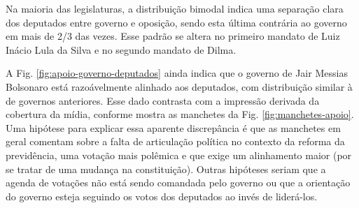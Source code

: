 \documentclass[12pt,a4paper]{article}
\begin{document}
Na maioria das legislaturas, a distribuição bimodal indica uma separação clara dos deputados
entre governo e oposição, sendo esta última contrária ao governo em mais de 2/3 das vezes.
Esse padrão se altera no primeiro mandato de Luiz Inácio Lula da Silva e no segundo mandato de Dilma.

A Fig. \ref{fig:apoio-governo-deputados} ainda indica que o governo de Jair Messias Bolsonaro está 
razoávelmente alinhado aos deputados, com distribuição similar à de governos anteriores. Esse dado contrasta
com a impressão derivada da cobertura da mídia, conforme mostra as manchetes da Fig. \ref{fig:manchetes-apoio}.
Uma hipótese para explicar essa aparente discrepância é que as manchetes em geral comentam sobre
a falta de articulação política no contexto da reforma da previdência, uma votação mais polêmica e
que exige um alinhamento maior (por se tratar de uma mudança na constituição). Outras hipóteses seriam
que a agenda de votações não está sendo comandada pelo governo ou que a orientação do governo esteja
seguindo os votos dos deputados ao invés de liderá-los.
\end{document}
